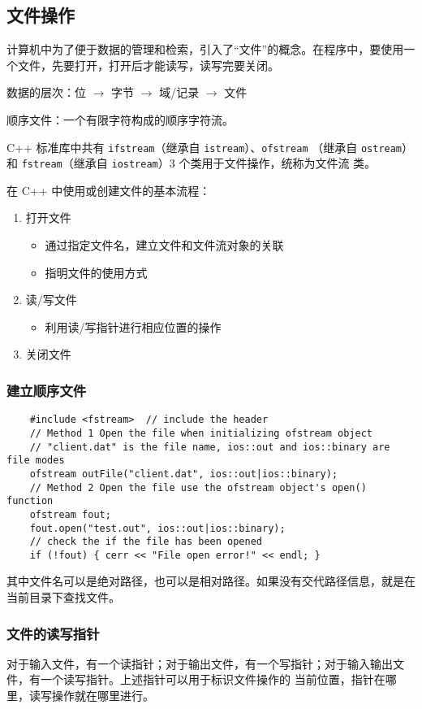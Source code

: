 \documentclass[UTF8]{ctexart}
\begin{document}
\subsection{文件操作}
计算机中为了便于数据的管理和检索，引入了“文件”的概念。在程序中，要使用一个文件，先要打开，打开后才能读写，读写完要关闭。

数据的层次：位 $\rightarrow$ 字节 $\rightarrow$ 域/记录 $\rightarrow$ 文件

顺序文件：一个有限字符构成的顺序字符流。

C++ 标准库中共有 \texttt{ifstream}（继承自 \texttt{istream}）、\texttt{ofstream}
（继承自 \texttt{ostream}） 和 \texttt{fstream}（继承自 \texttt{iostream}）3 个类用于文件操作，统称为文件流
类。

在 C++ 中使用或创建文件的基本流程：
\begin{enumerate}
    \item 打开文件
    \begin{itemize}
        \item 通过指定文件名，建立文件和文件流对象的关联
        \item 指明文件的使用方式
    \end{itemize}
    \item 读/写文件
    \begin{itemize}
        \item 利用读/写指针进行相应位置的操作
    \end{itemize}
    \item 关闭文件
\end{enumerate}

\subsubsection{建立顺序文件}
\begin{verbatim}
    #include <fstream>  // include the header
    // Method 1 Open the file when initializing ofstream object
    // "client.dat" is the file name, ios::out and ios::binary are file modes
    ofstream outFile("client.dat", ios::out|ios::binary);
    // Method 2 Open the file use the ofstream object's open() function
    ofstream fout;
    fout.open("test.out", ios::out|ios::binary);
    // check the if the file has been opened
    if (!fout) { cerr << "File open error!" << endl; }
\end{verbatim}
其中文件名可以是绝对路径，也可以是相对路径。如果没有交代路径信息，就是在当前目录下查找文件。

\subsubsection{文件的读写指针}
对于输入文件，有一个读指针；对于输出文件，有一个写指针；对于输入输出文件，有一个读写指针。上述指针可以用于标识文件操作的
当前位置，指针在哪里，读写操作就在哪里进行。
\end{document}
